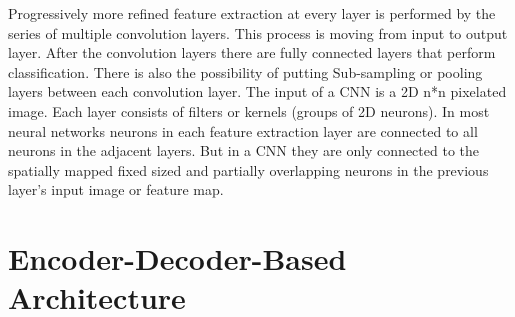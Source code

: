Progressively more refined feature extraction at every layer is performed by the series of multiple convolution layers. This process is moving from input to output layer. After the convolution layers there are fully connected layers that perform classification. There is also the possibility of putting Sub-sampling or pooling layers between each convolution layer. The input of a CNN is a 2D n*n pixelated image. Each layer consists of filters or kernels (groups of 2D neurons). In most neural networks neurons in each feature extraction layer are connected to all neurons in the adjacent layers. But in a CNN they are only connected to the spatially mapped fixed sized and partially overlapping neurons in the previous layer’s input image or feature map.



\section{Encoder-Decoder-Based Architecture}









